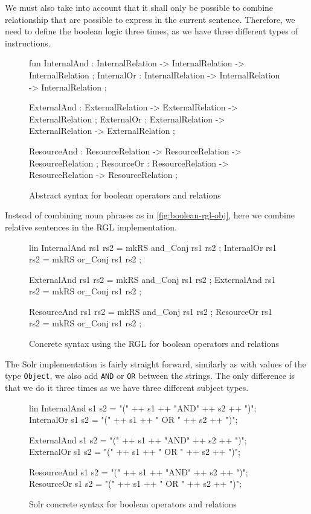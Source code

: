 We must also take into account that it shall only be possible to combine relationship that are possible to express in the current sentence. Therefore, we need to define the boolean logic three times, as we have three different types of instructions.

\begin{figure}[H]
\begin{code}
fun
  InternalAnd : InternalRelation -> InternalRelation -> InternalRelation ;
  InternalOr : InternalRelation -> InternalRelation -> InternalRelation ;

  ExternalAnd : ExternalRelation -> ExternalRelation -> ExternalRelation ;
  ExternalOr : ExternalRelation -> ExternalRelation -> ExternalRelation ;
 	  
  ResourceAnd : ResourceRelation -> ResourceRelation -> ResourceRelation ;
  ResourceOr : ResourceRelation -> ResourceRelation -> ResourceRelation ;
\end{code}
\caption{Abstract syntax for boolean operators and relations\label{fig:boolean-abstract-relations}}
\end{figure}

Instead of combining noun phrases as in \autoref{fig:boolean-rgl-obj}, here we combine relative sentences in the RGL implementation.

\begin{figure}[H]
\begin{code}
lin
  InternalAnd rs1 rs2 = mkRS and_Conj rs1 rs2 ;
  InternalOr rs1 rs2 = mkRS or_Conj rs1 rs2 ;
	  
  ExternalAnd rs1 rs2 = mkRS and_Conj rs1 rs2 ;
  ExternalAnd rs1 rs2 = mkRS or_Conj rs1 rs2 ;
	  
  ResourceAnd rs1 rs2 = mkRS and_Conj rs1 rs2 ;
  ResourceOr rs1 rs2 = mkRS or_Conj rs1 rs2 ;
\end{code}
\caption{Concrete syntax using the RGL for boolean operators and relations\label{fig:boolean-rgl-relations}}
\end{figure}

The Solr implementation is fairly straight forward, similarly as with values of the type \texttt{Object}, we also add \texttt{AND} or \texttt{OR} between the strings. The only difference is that we do it three times as we have three different subject types.

\begin{figure}[H]
\begin{code}
lin
  InternalAnd s1 s2 = "(" ++ s1 ++ "AND" ++ s2 ++ ")";
  InternalOr s1 s2 = "(" ++ s1 ++ " OR " ++ s2 ++ ")";

  ExternalAnd s1 s2 = "(" ++ s1 ++ "AND" ++ s2 ++ ")";
  ExternalOr s1 s2 = "(" ++ s1 ++ " OR " ++ s2 ++ ")";

  ResourceAnd s1 s2 = "(" ++ s1 ++ "AND" ++ s2 ++ ")";
  ResourceOr s1 s2 = "(" ++ s1 ++ " OR " ++ s2 ++ ")";
\end{code}
\caption{Solr concrete syntax for boolean operators and relations\label{fig:boolean-solr-relations}}
\end{figure}

